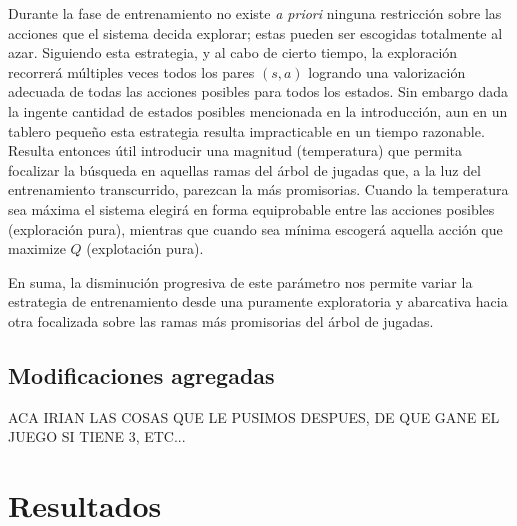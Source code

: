 \documentclass[11pt, spanish]{article}
\begin{document}
\par Durante la fase de entrenamiento no existe \emph{a priori} ninguna 
restricción sobre las acciones que el sistema decida explorar; estas pueden ser 
escogidas totalmente al azar. Siguiendo esta estrategia, y al cabo de 
cierto tiempo, la exploración recorrerá múltiples veces todos los pares 
$(s,a)$ logrando una valorización adecuada de todas las acciones posibles para 
todos los estados. Sin embargo dada la ingente cantidad de estados posibles 
mencionada en la introducción, aun en un tablero pequeño esta estrategia 
resulta impracticable en un tiempo razonable. Resulta entonces útil introducir 
una magnitud (temperatura) que permita focalizar la búsqueda en aquellas ramas 
del árbol de jugadas que, a la luz del entrenamiento transcurrido, parezcan la 
más promisorias. Cuando la temperatura sea máxima el sistema elegirá en forma 
equiprobable entre las acciones posibles (exploración pura), mientras que 
cuando sea mínima escogerá aquella acción que maximize $Q$ (explotación pura).
\par En suma, la disminución progresiva de este parámetro nos permite variar la 
estrategia de entrenamiento desde una puramente exploratoria y abarcativa hacia 
otra focalizada sobre las ramas más promisorias del árbol de jugadas.

\subsection{Modificaciones agregadas}
ACA IRIAN LAS COSAS QUE LE PUSIMOS DESPUES, DE QUE GANE EL JUEGO SI TIENE 3, ETC...

\section{Resultados}
\end{document}

